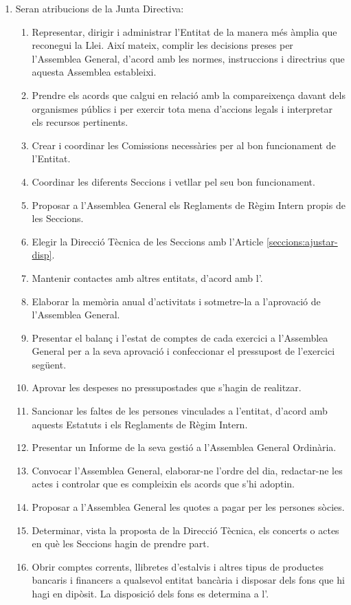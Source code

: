 \documentclass[11pt,a4paper]{article}
\newcommand{\JD}{Junta Directiva\xspace}
\newcommand{\AG}{Assemblea General\xspace}
\newcommand{\AGO}{Assemblea General Ordinària\xspace}
\newcommand{\DT}{Direcció Tècnica\xspace}
\DeclareRobustCommand{\RRIs}{Reglaments de Règim Intern\xspace}
\begin{document}
\begin{enumerate}
    \item[] Seran atribucions de la \JD:
    \begin{enumerate}
        \item Representar, dirigir i administrar l'Entitat de la manera més àmplia que reconegui la Llei. Així mateix, complir les decisions preses per l'\AG, d'acord amb les normes, instruccions i directrius que aquesta Assemblea estableixi.
        \item Prendre els acords que calgui en relació amb la compareixença davant dels organismes públics i per exercir tota mena d'accions legals i interpretar els recursos pertinents.
        \item Crear i coordinar les Comissions necessàries per al bon funcionament de l'Entitat.
        \item Coordinar les diferents Seccions i vetllar pel seu bon funcionament.
        \item Proposar a l'\AG els \RRIs propis de les Seccions.
        \item Elegir la \DT de les Seccions amb l'Article \ref{seccions:ajustar-disp}.
        \item Mantenir contactes amb altres entitats, d'acord amb l'.
        \item Elaborar la memòria anual d'activitats i sotmetre-la a l'aprovació de l'\AG.
        \item Presentar el balanç i l'estat de comptes de cada exercici a l'\AG per a la seva aprovació i confeccionar el pressupost de l'exercici següent.
        \item Aprovar les despeses no pressupostades que s'hagin de realitzar.
        \item Sancionar les faltes de les persones vinculades a l'entitat, d'acord amb aquests Estatuts i els \RRIs.
        \item Presentar un Informe de la seva gestió a l'\AGO.
        \item Convocar l'\AG, elaborar-ne l'ordre del dia, redactar-ne les actes i controlar que es compleixin els acords que s'hi adoptin.
        \item Proposar a l'\AG les quotes a pagar per les persones sòcies.
        \item Determinar, vista la proposta de la \DT, els concerts o actes en què les Seccions hagin de prendre part.
        \item Obrir comptes corrents, llibretes d'estalvis i altres tipus de productes bancaris i financers a qualsevol entitat bancària i disposar dels fons que hi hagi en dipòsit. La disposició dels fons es determina a l'.

\end{enumerate}
\end{enumerate}
\end{document}
